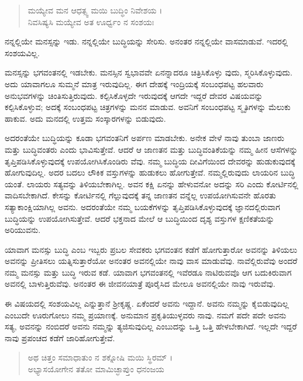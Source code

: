 \begin{verse}
ಮಯ್ಯೇವ ಮನ ಆಧತ್ಸ್ವ ಮಯಿ ಬುದ್ಧಿಂ ನಿವೇಶಯ ।\\ನಿವಸಿಷ್ಯಸಿ ಮಯ್ಯೇವ ಅತ ಊರ್ಧ್ವಂ ನ ಸಂಶಯಃ 
\end{verse}

{\small ನನ್ನಲ್ಲಿಯೇ ಮನಸ್ಸನ್ನು ಇಡು. ನನ್ನಲ್ಲಿಯೇ ಬುದ್ಧಿಯನ್ನು ಸೇರಿಸು. ಅನಂತರ ನನ್ನಲ್ಲಿಯೇ ವಾಸಮಾಡುವೆ. ಇದರಲ್ಲಿ ಸಂಶಯವಿಲ್ಲ.}

ಮನಸ್ಸನ್ನು ಭಗವಂತನಲ್ಲಿ ಇಡಬೇಕು. ಮನಸ್ಸಿನ ಸ್ವಭಾವವೇ ಏನನ್ನಾದರೂ ಚಿತ್ರಿಸಿಕೊಳ್ಳು ವುದು, ಸ್ಮರಿಸಿಕೊಳ್ಳುವುದು. ಅದು ಯಾವಾಗಲೂ ಸುಮ್ಮನೆ ಮಾತ್ರ ಇರುವುದಿಲ್ಲ. ಈಗ ದೇಹಕ್ಕೆ ಇಂದ್ರಿಯಕ್ಕೆ ಸಂಬಂಧಪಟ್ಟ ಹಲವಾರು ಅನುಭವಗಳನ್ನು ಚಿಂತಿಸುತ್ತಿರುವುದು. ಕಲ್ಪಿಸಿಕೊಳ್ಳದೇ ಇರುವುದಕ್ಕೆ ಆಗದೇ ಇದ್ದರೆ ದೇವರ ವಿಷಯವನ್ನು ಕಲ್ಪಿಸಿಕೊಳ್ಳುವ; ಅದಕ್ಕೆ ಸಂಬಂಧಪಟ್ಟ ಚಿತ್ರಗಳನ್ನು ಮನನ ಮಾಡುವ. ಅವನಿಗೆ ಸಂಬಂಧಪಟ್ಟ ಸ್ಮೃತಿಗಳನ್ನು ಮೆಲುಕು ಹಾಕುವ. ಅದು ಮನದಲ್ಲಿ ಉತ್ತಮ ಸಂಸ್ಕಾರಗಳನ್ನು ಬಿಡುವುದು.

ಅದರಂತೆಯೇ ಬುದ್ಧಿಯನ್ನು ಕೂಡಾ ಭಗವಂತನಿಗೆ ಅರ್ಪಣ ಮಾಡಬೇಕು. ಅನೇಕ ವೇಳೆ ನಾವು ತುಂಬಾ ಜಾಣರು ಮತ್ತು ಬುದ್ಧಿವಂತರು ಎಂದು ಭಾವಿಸುತ್ತೇವೆ. ಆದರೆ ಆ ಜಾಣತನ ಮತ್ತು ಬುದ್ಧಿವಂತಿಕೆಯನ್ನು ನಮ್ಮ ಹೀನ ಆಸೆಗಳನ್ನು ತೃಪ್ತಿಪಡಿಸಿಕೊಳ್ಳುವುದಕ್ಕೆ ಉಪಯೋಗಿಸಿಕೊಂಡಿರು ವೆವು. ನಮ್ಮ ಬುದ್ಧಿಯ ದೀವಿಗೆಯಿಂದ ದೇವರನ್ನು ಹುಡುಕುವುದಕ್ಕೆ ಹೋಗುವುದಿಲ್ಲ. ಅದರ ಬದಲು ಲೌಕಿಕ ವಸ್ತುಗಳನ್ನು ಹುಡುಕಲು ಹೋಗುತ್ತೇವೆ. ನಮ್ಮಲ್ಲಿರುವುದು ಲಾಯರಿನ ಬುದ್ಧಿ ಯಂತೆ. ಲಾಯರು ಸತ್ಯವನ್ನು ತಿಳಿಯಬೇಕಾಗಿಲ್ಲ. ಅವನ ಕಕ್ಷಿ ಏನನ್ನು ಹೇಳುವನೋ ಅದನ್ನು ಸರಿ ಎಂದು ಕೋರ್ಟಿನಲ್ಲಿ ವಾದಿಸಬೇಕಾಗಿದೆ. ಕೇಸನ್ನು ಕೋರ್ಟಿನಲ್ಲಿ ಗೆಲ್ಲುವುದಕ್ಕೆ ತನ್ನ ಜಾಣತನ ವನ್ನೆಲ್ಲ ಉಪಯೋಗಿಸುವನೇ ಹೊರತು ಸತ್ಯಾಕಾಂಕ್ಷಿಯಾಗಿಲ್ಲ ಅವನು. ಅದರಂತೆಯೇ ನಮ್ಮ ಬಯಕೆಗಳನ್ನು ತೃಪ್ತಿಪಡಿಸಿಕೊಳ್ಳುವುದಕ್ಕೆ ಜ್ಞಾನದಲ್ಲಿರುವಾಗ ಬುದ್ಧಿಯನ್ನು ಉಪಯೋಗಿಸುತ್ತೇವೆ. ಆದರೆ ಭಕ್ತನಾದ ಮೇಲೆ ಆ ಬುದ್ಧಿಯಿಂದ ದೃಶ್ಯ ವಸ್ತುಗಳ ಕ್ಷಣಿಕತೆಯನ್ನು ಅರಿಯುವನು.

ಯಾವಾಗ ಮನಸ್ಸು ಬುದ್ಧಿ ಎಂಬ ಇಬ್ಬರು ಪ್ರಬಲ ಸೇವಕರು ಭಗವಂತನ ಕಡೆಗೆ ಹೋಗುತ್ತಾರೋ ಅವನನ್ನು ತಿಳಿಯಲು ಅವನನ್ನು ಪ್ರೀತಿಸಲು ಯತ್ನಿಸುತ್ತಾರೆಯೋ ಅನಂತರ ಅವನಲ್ಲಿಯೇ ನಾವು ವಾಸ ಮಾಡುವೆವು. ನಾವೆಲ್ಲಿರುವೆವು ಅಂದರೆ ನಮ್ಮ ಮನಸ್ಸು ಮತ್ತು ಬುದ್ಧಿ ಇರುವ ಕಡೆ. ಯಾವಾಗ ಭಗವಂತನಲ್ಲಿ ಇವೆರಡೂ ನಾಟಿರುವವೊ ಆಗ ಬದುಕಿರುವಾಗ ಅವನಲ್ಲಿ ಬಾಳುತ್ತಿರುವೆವು. ಅನಂತರ ಈ ಜೀವನಯಾತ್ರೆ ಪೂರೈಸಿದ ಮೇಲೂ ಅವನಲ್ಲಿಯೇ ನಾವು ಇರುವೆವು.

ಈ ವಿಷಯದಲ್ಲಿ ಸಂಶಯವಿಲ್ಲ ಎನ್ನುತ್ತಾನೆ ಶ್ರೀಕೃಷ್ಣ. ಏಕೆಂದರೆ ಅವನು ಇದ್ದಾನೆ. ಅವನು ನಮ್ಮನ್ನು ಕೈಬಿಡುವುದಿಲ್ಲ ಎಂಬುದೇ ಊರುಗೋಲು ನಮ್ಮ ಪ್ರಯಾಣಕ್ಕೆ. ಅನುಮಾನ ಪ್ರಕೃತಿಯುಳ್ಳವರು ನಾವು. ನಮಗೆ ಪದೇ ಪದೇ ಅವನು ಸತ್ಯ, ಅವನನ್ನು ನಂಬಿದರೆ ಅವನು ನಮ್ಮನ್ನು ತ್ಯಜಿಸುವುದಿಲ್ಲ ಎಂಬುದನ್ನು ಒತ್ತಿ ಒತ್ತಿ ಹೇಳಬೇಕಾಗಿದೆ. ಇಲ್ಲದೇ ಇದ್ದರೆ ನಾವು ಪ್ರಪಂಚದ ಕಡೆಗೆ ಜಾರಿಹೋಗುತ್ತೇವೆ.

\begin{verse}
ಅಥ ಚಿತ್ತಂ ಸಮಾಧಾತುಂ ನ ಶಕ್ನೋಷಿ ಮಯಿ ಸ್ಥಿರಮ್ ।\\ಅಭ್ಯಾಸಯೋಗೇನ ತತೋ ಮಾಮಿಚ್ಛಾಪ್ತುಂ ಧನಂಜಯ 
\end{verse}

